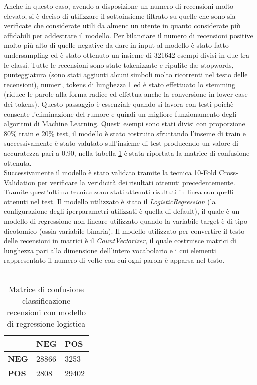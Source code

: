 Anche in questo caso, avendo a disposizione un numero di recensioni molto elevato, si è deciso di utilizzare il sottoinsieme filtrato su quelle che sono sia verificate che considerate utili da almeno un utente in quanto considerate più affidabili per addestrare il modello. Per bilanciare il numero di recensioni positive molto più alto di quelle negative da dare in input al modello è stato fatto undersampling ed è stato ottenuto un insieme di 321642 esempi divisi in due tra le classi. 
Tutte le recensioni sono state tokenizzate e ripulite da: stopwords, punteggiatura (sono stati aggiunti alcuni simboli molto ricorrenti nel testo delle recensioni), numeri, tokens di lunghezza 1 ed è stato effettuato lo stemming (riduce le parole alla forma radice ed effettua anche la conversione in lower case dei tokens). Questo passaggio è essenziale quando si lavora con testi poichè consente l'eliminazione del rumore e quindi un migliore funzionamento degli algoritmi di Machine Learning.
Questi esempi sono stati divisi con proporzione 80\% train e 20\% test, il modello è stato costruito sfruttando l'inseme di train e successivamente è stato valutato sull'insieme di test producendo un valore di accuratezza pari a 0.90, nella tabella \ref{tab:matriceConfusioneModello} è stata riportata la matrice di confusione ottenuta. \\
Successivamente il modello è stato validato tramite la tecnica 10-Fold Cross-Validation per verificare la veridicità dei risultati ottenuti precedentemente. Tramite quest'ultima tecnica sono stati ottenuti risultati in linea con quelli ottenuti nel test. Il modello utilizzato è stato il \textit{LogisticRegression} (la configurazione degli iperparametri utilizzati è quella di default), il quale è un modello di regressione non lineare utilizzato quando la variabile target è di tipo dicotomico (ossia variabile binaria). Il modello utilizzato per convertire il testo delle recensioni in matrici è il \textit{CountVectorizer}, il quale  costruisce matrici di lunghezza pari alla dimensione dell'intero vocabolario e i cui elementi rappresentato il numero di volte con cui ogni parola è apparsa nel testo.\\\\
\begin{table}[H]\centering
    \begin{tabular}{l|l|l|}
    \cline{2-3}
     & \textbf{NEG} & \textbf{POS} \\ \hline
    \multicolumn{1}{|l|}{\textbf{NEG}} & 28866 & 3253 \\ \hline
    \multicolumn{1}{|l|}{\textbf{POS}} & 2808 & 29402 \\ \hline
    \end{tabular}
    \caption{Matrice di confusione classificazione recensioni con modello di regressione logistica}
    \label{tab:matriceConfusioneModello}
\end{table}

